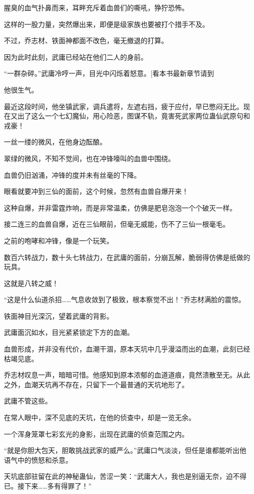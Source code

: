 \begin{this_body}
腥臭的血气扑鼻而来，耳畔充斥着血兽们的嘶吼，狰狞恐怖。

这样的一股力量，突然爆出来，即便是级家族也要被打个措手不及。

不过，乔志材、铁面神都面不改色，毫无撤退的打算。

因为此时此刻，武庸已经站在他们二人的身前。

“一群杂碎。”武庸冷哼一声，目光中闪烁着怒意。[看本书最新章节请到

他很生气。

最近这段时间，他坐镇武家，调兵遣将，左遮右挡，疲于应付，早已憋闷无比。现在又出了这么一个七幻魔仙，用心险恶，图谋不轨，竟害死武家两位蛊仙武原句和戎豪！

一丝一缕的微风，在他身边酝酿。

翠绿的微风，不知不觉间，也在冲锋嚎叫的血兽中围绕。

血兽仍旧汹涌，冲锋的度并未有丝毫的下降。

眼看就要冲到三仙的面前，这个时候，忽然有血兽自爆开来！

这种自爆，并非雷霆炸响，而是非常温柔，仿佛是肥皂泡泡一个个破灭一样。

接二连三的血兽自爆，近在三仙眼前，但毫无威能，伤不了三仙一根毫毛。

之前的咆哮和冲锋，像是一个玩笑。

数百六转战力，数十头七转战力，在武庸的面前，分崩瓦解，脆弱得仿佛是纸做的玩具。

这就是八转之威！

“这是什么仙道杀招……气息收敛到了极致，根本察觉不出！”乔志材满脸的震惊。

铁面神目光深沉，望着武庸的背影。

武庸面沉如水，目光紧紧锁定下方的血潮。

血兽形成，并非没有代价，血潮干涸，原本天坑中几乎漫溢而出的血潮，此刻已经枯竭见底。

乔志材叹息一声，暗暗可惜。他感知到原本浓郁的血道道痕，竟然溃散至无。从此之外，血潮天坑再不存在，只留下一个最普通的天坑地形了。

武庸不管这些。

在常人眼中，深不见底的天坑，在他的侦查中，却是一览无余。

一个浑身笼罩七彩玄光的身影，出现在武庸的侦查范围之内。

“就是你胆大包天，胆敢挑战武家的威严么。”武庸口气淡淡，但任是谁都能听出他语气中的愤怒和杀意。

天坑底部驻留在此的神秘蛊仙，苦涩一笑：“武庸大人，我也是别逼无奈，迫不得已。接下来……多有得罪了！”


\end{this_body}
